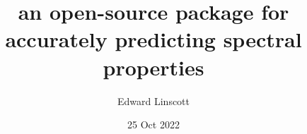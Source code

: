 \documentclass[xcolor=table,aspectratio=169]{beamer}
\title{\noindent\large{an open-source package for accurately predicting spectral properties}}
\author{Edward Linscott}
\institute{EPFL}
\date{25 Oct 2022}
\numberwithin{equation}{section}
\begin{document}
\frame{\titlepage}

% 
% 
% 
% 
% 
% 

\end{document}
